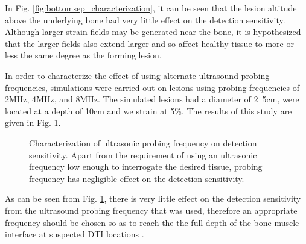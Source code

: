 			In Fig. \ref{fig:bottomsep_characterization}, it can be seen that the lesion altitude above the underlying bone had very little effect on the detection sensitivity. Although larger strain fields may be generated near the bone, it is hypothesized that the larger fields also extend larger and so affect healthy tissue to more or less the same degree as the forming lesion.

			In order to characterize the effect of using alternate ultrasound probing frequencies, simulations were carried out on lesions using probing frequencies of \unit{2}{MHz}, \unit{4}{MHz}, and \unit{8}{MHz}. The simulated lesions had a diameter of \unit{2.5}{cm}, were located at a depth of \unit{10}{cm} and we strain at \unit{5}{\%}. The results of this study are given in Fig. \ref{fig:freq_characterization}.

			\begin{figure}[!t]
				\centering
				\caption[Ultrasonic probing frequency characterization]{Characterization of ultrasonic probing frequency on detection sensitivity. Apart from the requirement of using an ultrasonic frequency low enough to interrogate the desired tissue, probing frequency has negligible effect on the detection sensitivity.}
				\label{fig:freq_characterization}
			\end{figure}

			As can be seen from Fig. \ref{fig:freq_characterization}, there is very little effect on the detection sensitivity from the ultrasound probing frequency that was used, therefore an appropriate frequency should be chosen so as to reach the the full depth of the bone-muscle interface at suspected DTI locations .


